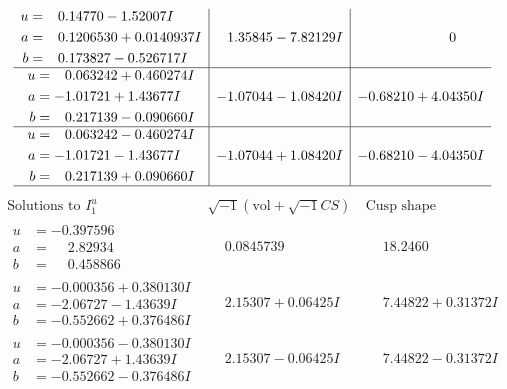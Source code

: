 \documentclass[1p]{elsarticle_modified}
\theoremstyle{definition}
\newcommand{\I}{\sqrt{-1}}
\begin{document}
$$\begin{array}{c|c|c}
\begin{aligned}
u &= \phantom{-}0.14770 - 1.52007 I \\
a &= \phantom{-}0.1206530 + 0.0140937 I \\
b &= \phantom{-}0.173827 - 0.526717 I\end{aligned}
 & \phantom{-}1.35845 - 7.82129 I & \phantom{-0.000000 } 0 \\ \hline\begin{aligned}
u &= \phantom{-}0.063242 + 0.460274 I \\
a &= -1.01721 + 1.43677 I \\
b &= \phantom{-}0.217139 - 0.090660 I\end{aligned}
 & -1.07044 - 1.08420 I & -0.68210 + 4.04350 I \\ \hline\begin{aligned}
u &= \phantom{-}0.063242 - 0.460274 I \\
a &= -1.01721 - 1.43677 I \\
b &= \phantom{-}0.217139 + 0.090660 I\end{aligned}
 & -1.07044 + 1.08420 I & -0.68210 - 4.04350 I\\
 \hline 
 \end{array}$$\newpage$$\begin{array}{c|c|c}  
\text{Solutions to }I^u_{1}& \I (\text{vol} + \sqrt{-1}CS) & \text{Cusp shape}\\
 \hline 
\begin{aligned}
u &= -0.397596\phantom{ +0.000000I} \\
a &= \phantom{-}2.82934\phantom{ +0.000000I} \\
b &= \phantom{-}0.458866\phantom{ +0.000000I}\end{aligned}
 & \phantom{-}0.0845739\phantom{ +0.000000I} & \phantom{-}18.2460\phantom{ +0.000000I} \\ \hline\begin{aligned}
u &= -0.000356 + 0.380130 I \\
a &= -2.06727 - 1.43639 I \\
b &= -0.552662 + 0.376486 I\end{aligned}
 & \phantom{-}2.15307 + 0.06425 I & \phantom{-}7.44822 + 0.31372 I \\ \hline\begin{aligned}
u &= -0.000356 - 0.380130 I \\
a &= -2.06727 + 1.43639 I \\
b &= -0.552662 - 0.376486 I\end{aligned}
 & \phantom{-}2.15307 - 0.06425 I & \phantom{-}7.44822 - 0.31372 I \\ \hline\begin{aligned}

\end{aligned}
\end{array}$$
\end{document}
